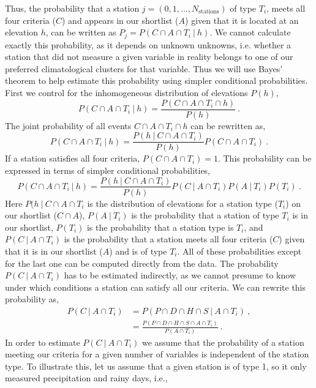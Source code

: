 \documentclass[12pt]{iopart}
\begin{document}
Thus, the probability that a station $j=(0,1,...,N_\mathrm{stations})$ of type $T_i$, meets all four criteria ($C$) and appears in our shortlist ($A$) given that it is located at an elevation $h$, can be written as $P_j=P(C\cap A\cap T_i\ |\ h)$. We cannot  calculate exactly this probability, as it depends on unknown unknowns, i.e. whether a station that did not measure a given variable in reality belongs to one of our preferred climatological clusters for that variable. Thus we will use Bayes' theorem to help estimate this probability using simpler conditional probabilities. First we control for the inhomogeneous distribution of elevations $P(h)$,
\begin{equation}
P(C\cap A\cap T_i\ |\ h)=\frac{P(C\cap A\cap T_i\cap h)}{P(h)}\ .
\end{equation}
The joint probability of all events $C\cap A\cap T_i\cap h$ can be rewritten as,
\begin{equation}
P(C\cap A\cap T_i\ |\ h)=\frac{P(h\ |\ C\cap A\cap T_i)}{P(h)}P(C\cap A\cap T_i)\ .
\end{equation}
If a station satisfies all four criteria, $P(C\cap A\cap T_i)=1$. This probability can be expressed in terms of simpler conditional probabilities,
\begin{equation}
P(C\cap A\cap T_i\ |\ h)=\frac{P(h\ |\ C\cap A\cap T_i)}{P(h)}P(C\ |\ A\cap T_i)P(A\ |\ T_i)P(T_i)\ .
\end{equation}
Here $P(h\ |\ C\cap A\cap T_i$ is the distribution of elevations for a station type ($T_i$) on our shortlist ($C\cap A$), $P(A\ |\ T_i)$ is the probability that a station of type $T_i$ is in our shortlist, $P(T_i)$ is the probability that a station type is $T_i$, and $P(C\ |\ A\cap T_i)$ is the probability that a station meets all four criteria ($C$) given that it is in our shortlist ($A$) and is of type $T_i$. All of these probabilities except for the last one can be computed directly from the data.  The probability $P(C\ |\ A\cap T_i)$ has to be estimated indirectly, as we cannot presume to know under which conditions a station can satisfy all our criteria. We can rewrite this probability as,
\begin{eqnarray}
P(C\ |\ A\cap T_i)&=P(P\cap D\cap H\cap S\ |\ A\cap T_i)\ , \\
\label{pclanti}
&=\frac{P(P\cap D\cap H\cap S\cap A\cap T_i)}{P(A\cap T_i)}\ . 
\end{eqnarray}
In order to estimate $P(C\ |\ A\cap T_i)$ we assume that the probability of a station meeting our criteria for a given number of variables is independent of the station type. To illustrate this, let us assume that a given station is of type 1, so it only measured precipitation and rainy days, i.e.,
\end{document}
